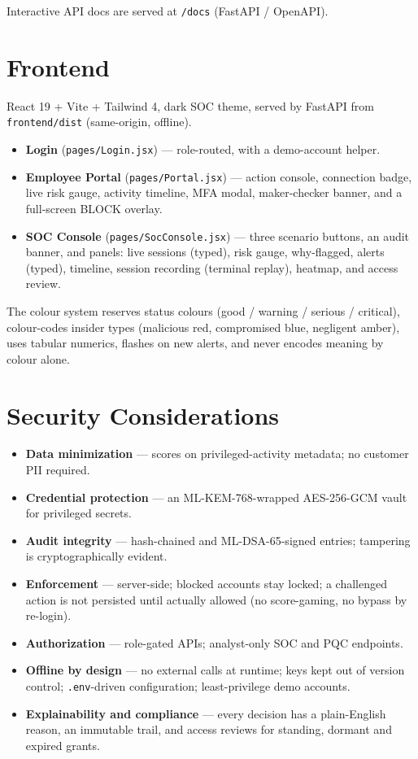 \documentclass[
]{article}
\providecommand{\tightlist}{%
  \setlength{\itemsep}{0pt}\setlength{\parskip}{0pt}}
\begin{document}
Interactive API docs are served at \texttt{/docs} (FastAPI / OpenAPI).

\section{Frontend}\label{frontend}

React 19 + Vite + Tailwind 4, dark SOC theme, served by FastAPI from
\texttt{frontend/dist} (same-origin, offline).

\begin{itemize}
\tightlist
\item
  \textbf{Login} (\texttt{pages/Login.jsx}) --- role-routed, with a
  demo-account helper.
\item
  \textbf{Employee Portal} (\texttt{pages/Portal.jsx}) --- action
  console, connection badge, live risk gauge, activity timeline, MFA
  modal, maker-checker banner, and a full-screen BLOCK overlay.
\item
  \textbf{SOC Console} (\texttt{pages/SocConsole.jsx}) --- three
  scenario buttons, an audit banner, and panels: live sessions (typed),
  risk gauge, why-flagged, alerts (typed), timeline, session recording
  (terminal replay), heatmap, and access review.
\end{itemize}

The colour system reserves status colours (good / warning / serious /
critical), colour-codes insider types (malicious red, compromised blue,
negligent amber), uses tabular numerics, flashes on new alerts, and
never encodes meaning by colour alone.

\section{Security Considerations}\label{security-considerations}

\begin{itemize}
\tightlist
\item
  \textbf{Data minimization} --- scores on privileged-activity metadata;
  no customer PII required.
\item
  \textbf{Credential protection} --- an ML-KEM-768-wrapped AES-256-GCM
  vault for privileged secrets.
\item
  \textbf{Audit integrity} --- hash-chained and ML-DSA-65-signed
  entries; tampering is cryptographically evident.
\item
  \textbf{Enforcement} --- server-side; blocked accounts stay locked; a
  challenged action is not persisted until actually allowed (no
  score-gaming, no bypass by re-login).
\item
  \textbf{Authorization} --- role-gated APIs; analyst-only SOC and PQC
  endpoints.
\item
  \textbf{Offline by design} --- no external calls at runtime; keys kept
  out of version control; \texttt{.env}-driven configuration;
  least-privilege demo accounts.
\item
  \textbf{Explainability and compliance} --- every decision has a
  plain-English reason, an immutable trail, and access reviews for
  standing, dormant and expired grants.
\end{itemize}
\end{document}
